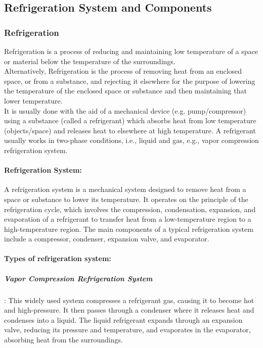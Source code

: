 \documentclass{article}
\begin{document}
\subsection{Refrigeration System and Components}
\subsubsection*{Refrigeration}
Refrigeration is a process of reducing and maintaining low temperature of a space or material below the temperature of the surroundings.\\
Alternatively, Refrigeration is the process of removing heat from an enclosed 
space, or from a substance, and rejecting it elsewhere for the 
purpose of lowering the temperature of the enclosed space or 
substance and then maintaining that lower temperature.\\
It is usually done with the aid of a mechanical device (e.g. pump/compressor) using a substance (called a refrigerant) which absorbs heat from low temperature (objects/space) and releases heat to elsewhere at high temperature. 
A refrigerant usually works in two-phase conditions, i.e., liquid and gas, e.g., vapor compression refrigeration system. 

\paragraph*{Refrigeration System:} 
A refrigeration system is a mechanical system designed to remove heat from a space or substance to lower its temperature. It operates on the principle of the refrigeration cycle, which involves the compression, condensation, expansion, and evaporation of a refrigerant to transfer heat from a low-temperature region to a high-temperature region. The main components of a typical refrigeration system include a compressor, condenser, expansion valve, and evaporator. 

\paragraph*{Types of refrigeration system:}
\subparagraph{Vapor Compression Refrigeration System}: This widely used system compresses a refrigerant gas, causing it to become hot and high-pressure. It then passes through a condenser where it releases heat and condenses into a liquid. The liquid refrigerant expands through an expansion valve, reducing its pressure and temperature, and evaporates in the evaporator, absorbing heat from the surroundings.
\end{document}
